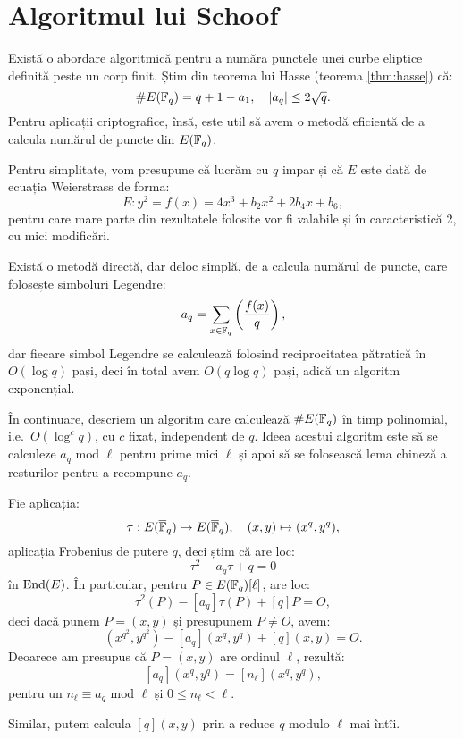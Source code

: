 
\chapter{Algoritmul lui Schoof}


Există o abordare algoritmică pentru a număra punctele unei curbe
eliptice definită peste un corp finit. Știm din teorema lui Hasse
(teorema \ref{thm:hasse}) că:
\[
    \# E(\mathbb{F}_q) = q + 1 - a_1, \quad |a_q| \leq 2 \sqrt{q}.
\]
Pentru aplicații criptografice, însă, este util să avem o metodă
eficientă de a calcula numărul de puncte din $ E(\mathbb{F}_q) $.

Pentru simplitate, vom presupune că lucrăm cu $ q $ impar și
că $ E $ este dată de ecuația Weierstrass de forma:
\[
    E: y^2 = f(x) = 4x^3 + b_2x^2 + 2b_4x + b_6,
\]
pentru care mare parte din rezultatele folosite vor fi valabile
și în caracteristică 2, cu mici modificări.

Există o metodă directă, dar deloc simplă, de a calcula numărul de
puncte, care folosește simboluri Legendre:
\[
    a_q = \sum_{x \in \mathbb{F}_q} \left( \dfrac{f(x)}{q} \right),
\]
dar fiecare simbol Legendre se calculează folosind reciprocitatea
pătratică în $ O(\log q) $ pași, deci în total avem $ O(q \log q) $
pași, adică un algoritm exponențial.

În continuare, descriem un algoritm care calculează $ \# E(\mathbb{F}_q) $ în
timp polinomial, i.e.\ $ O(\log^c q) $, cu $ c $ fixat, independent de $ q $.
Ideea acestui algoritm este să se calculeze $ a_q \text{ mod } \ell $
pentru prime mici $ \ell $ și apoi să se folosească lema chineză a resturilor
pentru a recompune $ a_q $.

Fie aplicația:
\[
    \tau : E(\overline{\mathbb{F}}_q) \to E(\overline{\mathbb{F}}_q), \quad (x, y) \mapsto (x^q, y^q),
\]
aplicația Frobenius de putere $ q $, deci știm că are loc:
\[
    \tau^2 - a_q \tau + q = 0
\]
în $ \mathrm{End}(E) $. În particular, pentru $ P \in E(\mathbb{F}_q)[\ell] $, are loc:
\[
    \tau^2(P) - [a_q]\tau(P) + [q]P = O,
\]
deci dacă punem $ P = (x, y) $ și presupunem $ P \neq O $, avem:
\[
    (x^{q^2}, y^{q^2}) - [a_q](x^q, y^q) + [q](x, y) = O.
\]
Deoarece am presupus că $ P = (x, y) $ are ordinul $ \ell $, rezultă:
\[
    [a_q](x^q, y^q) = [n_\ell](x^q, y^q),
\]
pentru un $ n_\ell \equiv a_q \text{ mod } \ell $ și $ 0 \leq n_\ell < \ell $.

Similar, putem calcula $ [q](x, y) $ prin a reduce $ q $ modulo $ \ell $ mai
întîi.

